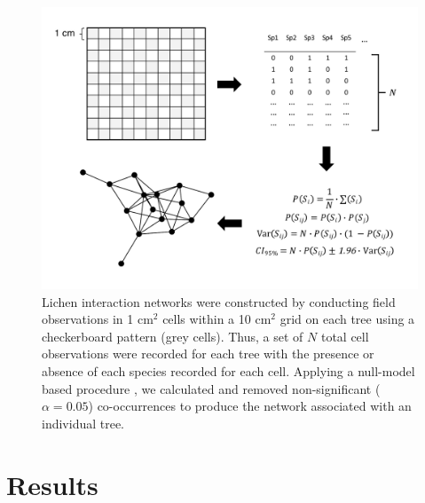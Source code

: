 \documentclass[fleqn,10pt]{wlscirep}
\begin{document}
\begin{figure}[ht]
\centering
\includegraphics[width=\linewidth]{conet_method.pdf}
\caption{Lichen interaction networks were constructed by conducting
  field observations in 1 cm$^2$ cells within a 10 cm$^2$ grid on each
  tree using a checkerboard pattern (grey cells). Thus, a set of $N$
  total cell observations were recorded for each tree with the
  presence or absence of each species recorded for each cell. Applying
  a null-model based procedure \cite{Araujo2011}, we calculated and
  removed non-significant ($\alpha = 0.05$) co-occurrences to produce
  the network associated with an individual tree.}
\label{fig:conet_method}
\end{figure}



\section*{Results}
\end{document}

